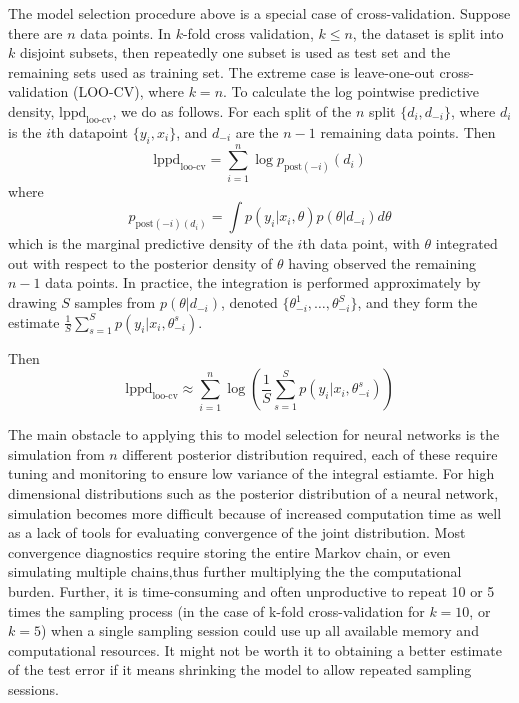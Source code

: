 \documentclass[12pt]{report}
\begin{document}
The model selection procedure above is a special case of cross-validation. Suppose there are $n$ data points. In $k$-fold cross validation,
$k\le n$, the dataset is split into $k$ disjoint subsets, then repeatedly one
subset is used as test set and the remaining sets used as training set. The
extreme case is leave-one-out cross-validation (LOO-CV), where $k=n$. To
calculate the log pointwise predictive density, $\text{lppd}_{\text{loo-cv}}$, we do as
follows. For each split of the $n$ split $\{d_i,d_{-i}\}$, where $d_i$ is the
$i$th datapoint $\{y_i,x_i\}$, and $d_{-i}$ are the $n-1$ remaining data points.
Then
\[ \text{lppd}_{\text{loo-cv}} = \sum_{i=1}^n \log p_{\text{post}(-i)}(d_i) \]
where 
\[p_{\text{post}(-i)(d_i)} = \int p(y_i|x_i,\theta) p(\theta |d_{-i}) d\theta \]
which is the marginal predictive density of the $i$th data point, with $\theta$
integrated out with respect to the posterior density of $\theta$ having observed
the remaining $n-1$ data points. In practice, the integration is performed
approximately by drawing $S$ samples from $p(\theta|d_{-i})$, denoted
$\{\theta_{-i}^1,\dots, \theta_{-i}^S\}$, and they form the estimate
$\frac{1}{S} \sum_{s=1}^S p(y_i|x_i,\theta_{-i}^s) $.

Then
\[\text{lppd}_{\text{loo-cv}} \approx \sum_{i=1}^n \log (\frac{1}{S} \sum_{s=1}^S
p(y_i|x_i,\theta_{-i}^s))\]

The main obstacle to applying this to model selection for neural networks is the
simulation from $n$ different posterior distribution required, each of these
require tuning and monitoring to ensure low variance of the integral estiamte.
For high dimensional distributions such as the posterior distribution of a neural
network, simulation becomes more difficult because of increased computation time as
well as a lack of tools for evaluating convergence of the joint distribution.
Most convergence diagnostics require storing the entire Markov chain, or even
simulating multiple chains,thus further multiplying the the computational burden. Further, it is time-consuming and often unproductive to repeat 10 or 5 times the sampling process  
(in the case of k-fold cross-validation for $k=10$, or $k=5$) when a single sampling session could use up all available memory and computational resources. 
It might not be worth it to obtaining a better estimate of the test error if it means shrinking the model to allow repeated sampling sessions.
\end{document}

